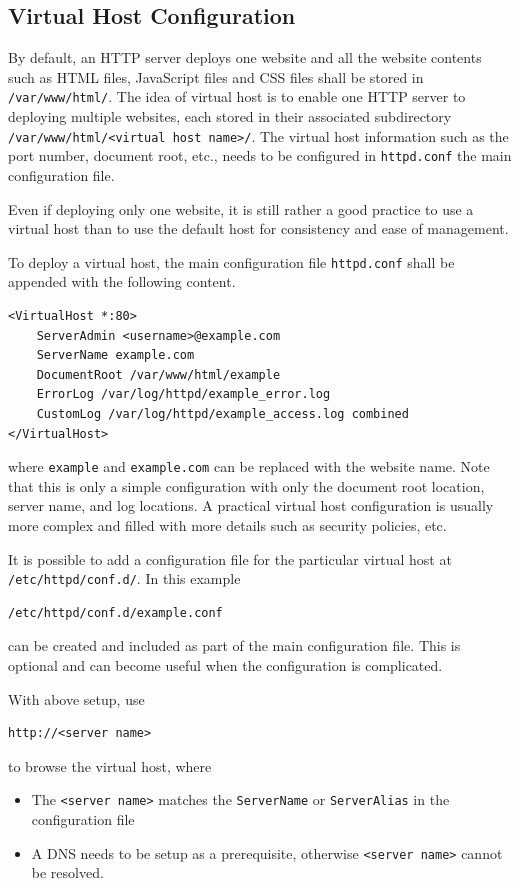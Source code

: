 \subsection{Virtual Host Configuration}

\begin{shortbox}
	
	By default, an HTTP server deploys one website and all the website contents such as HTML files, JavaScript files and CSS files shall be stored in \verb|/var/www/html/|. The idea of virtual host is to enable one HTTP server to deploying multiple websites, each stored in their associated subdirectory \verb|/var/www/html/<virtual host name>/|. The virtual host information such as the port number, document root, etc., needs to be configured in \verb|httpd.conf| the main configuration file.
	
	Even if deploying only one website, it is still rather a good practice to use a virtual host than to use the default host for consistency and ease of management.
\end{shortbox}

To deploy a virtual host, the main configuration file \verb|httpd.conf| shall be appended with the following content.
\begin{lstlisting}
<VirtualHost *:80>
	ServerAdmin <username>@example.com
	ServerName example.com
	DocumentRoot /var/www/html/example
	ErrorLog /var/log/httpd/example_error.log
	CustomLog /var/log/httpd/example_access.log combined
</VirtualHost>
\end{lstlisting}
where \verb|example| and \verb|example.com| can be replaced with the website name. Note that this is only a simple configuration with only the document root location, server name, and log locations. A practical virtual host configuration is usually more complex and filled with more details such as security policies, etc.

It is possible to add a configuration file for the particular virtual host at \verb|/etc/httpd/conf.d/|. In this example
\begin{lstlisting}
/etc/httpd/conf.d/example.conf
\end{lstlisting}
can be created and included as part of the main configuration file. This is optional and can become useful when the configuration is complicated.

With above setup, use
\begin{lstlisting}
http://<server name>
\end{lstlisting}
to browse the virtual host, where
\begin{itemize}
	\item The \verb|<server name>| matches the \verb|ServerName| or \verb|ServerAlias| in the configuration file
	\item A DNS needs to be setup as a prerequisite, otherwise \verb|<server name>| cannot be resolved.
\end{itemize}

